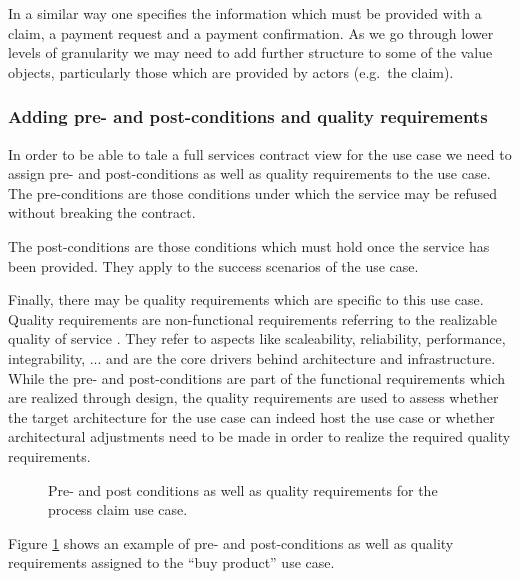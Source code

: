 \documentclass{IOS-Book-Article}
\begin{document}
In a similar way one specifies the information which must be provided with a claim, a payment request and a payment
confirmation. As we go through lower levels of granularity we may need to add further structure to some of the value
objects, particularly those which are provided by actors (e.g.\ the claim).


\subsubsection{Adding pre- and post-conditions and quality requirements}

In order to be able to tale a full services contract view for the use case we need to assign pre- and post-conditions
as well as quality requirements to the use case. The pre-conditions are those conditions under which the service
may be refused without breaking the contract. 

The post-conditions are those conditions which must hold once the service has been provided. They apply to
the success scenarios of the use case.

Finally, there may be quality requirements which are specific to this use case. Quality requirements are non-functional
requirements referring to the realizable quality of service \cite{Bass:softwareArchitecture}. They refer to aspects like
scaleability, reliability, performance, integrability, ... and are the core drivers behind architecture and infrastructure.
While the pre- and post-conditions are part of the functional requirements which are realized through design,
the quality requirements are used to assess whether the target architecture for the use case
can indeed host the use case or whether architectural adjustments need to be made in order to realize the required
quality requirements.

\begin{figure}
  \centering
  \caption{Pre- and post conditions as well as quality requirements for the process claim use case.}
  \label{fig:processClaimPrePostQuality}
\end{figure}

Figure \ref{fig:processClaimPrePostQuality} shows an example of pre- and post-conditions as well as quality requirements
assigned to the ``buy product'' use case. 

\end{document}
